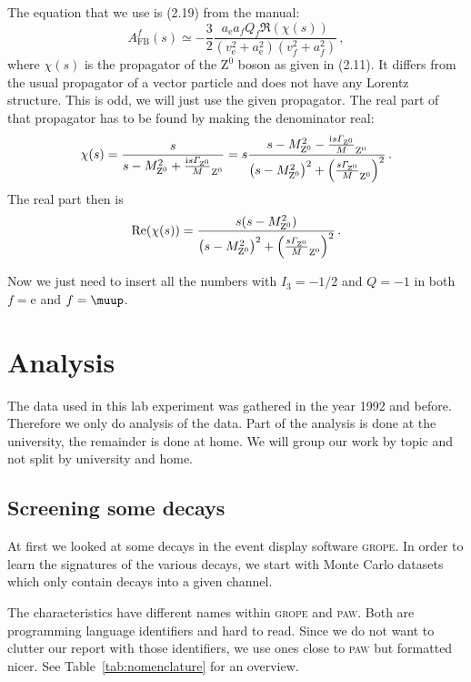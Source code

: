 \documentclass[11pt, english, fleqn, DIV=15, headinclude, BCOR=2cm]{scrreprt}
\newcommand\MZ{M_{\mathrm Z^0}}
\begin{document}
The equation that we use is (2.19) from the manual:
\[
    A_\text{FB}^f(s) \simeq - \frac 32 \frac{a_\mathrm e a_f Q_f \Re(\chi(s))}{(v_\mathrm e^2
    + a_\mathrm e^2)(v_f^2 + a_f^2)} \,,
\]
where $\chi(s)$ is the propagator of the $\mathrm Z^0$ boson as given in
(2.11). It differs from the usual propagator of a vector particle and does not
have any Lorentz structure. This is odd, we will just use the given propagator.
The real part of that propagator has to be found by making the denominator
real:
\[
    \chi(s)
    = \frac{s}{s - \MZ^2 + \frac{\iup s \Gamma_{\mathrm Z^0}}\MZ}
    = s \frac{s - \MZ^2 - \frac{\iup s \Gamma_{\mathrm Z^0}}\MZ}
    {\del{s - \MZ^2}^2 + \del{\frac{s \Gamma_{\mathrm Z^0}}\MZ}^2} \,.
\]
The real part then is
\[
    \Re(\chi(s))
    = \frac{s(s - \MZ^2)}
    {\del{s - \MZ^2}^2 + \del{\frac{s \Gamma_{\mathrm Z^0}}\MZ}^2} \,.
\]

Now we just need to insert all the numbers with $I_3 = -1/2$ and $Q = -1$ in
both $f = \mathrm e$ and $f = \muup$.


\chapter{Analysis}

The data used in this lab experiment was gathered in the year 1992 and before.
Therefore we only do analysis of the data. Part of the analysis is done at the
university, the remainder is done at home. We will group our work by topic and
not split by university and home.

\section{Screening some decays}

At first we looked at some decays in the event display software
\textsc{grope}. In order to learn the signatures of the various decays, we
start with Monte Carlo datasets which only contain decays into a given channel.

The characteristics have different names within \textsc{grope} and
\textsc{paw}. Both are programming language identifiers and hard to
read. Since we do not want to clutter our report with those identifiers, we use
ones close to \textsc{paw} but formatted nicer. See
Table~\ref{tab:nomenclature} for an overview.
\end{document}
